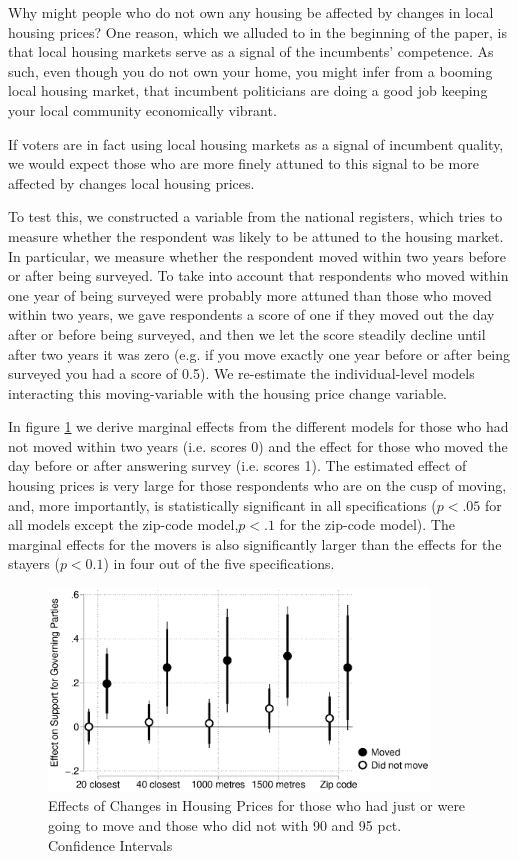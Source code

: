 \documentclass[12pt,a4paper]{article}
\begin{document}
	Why might people who do not own any housing be affected by changes in local housing prices? One reason, which we alluded to in the beginning of the paper, is that local housing markets serve as a signal of the incumbents' competence. As such, even though you do not own your home, you might infer from a booming local housing market, that incumbent politicians are doing a good job keeping your local community economically vibrant.
	
	If voters are in fact using local housing markets as a signal of incumbent quality, we would expect those who are more finely attuned to this signal to be more affected by changes local housing prices.
	
	To test this, we constructed a variable from the national registers, which tries to measure whether the respondent was likely to be attuned to the housing market. In particular, we measure whether the respondent moved within two years before or after being surveyed. To take into account that respondents who moved within one year of being surveyed were probably more attuned than those who moved within two years, we gave respondents a score of one if they moved out the day after or before being surveyed, and then we let the score steadily decline until after two years it was zero (e.g. if you move exactly one year before or after being surveyed you had a score of 0.5). We re-estimate the individual-level models interacting this moving-variable with the housing price change variable.
	
	In figure \ref{move} we derive marginal effects from the different models for those who had not moved within two years (i.e. scores 0) and the effect for those who moved the day before or after answering survey (i.e. scores 1). The estimated effect of housing prices is very large for those respondents who are on the cusp of moving, and, more importantly, is statistically significant in all specifications ($p<.05$ for all models except the zip-code model,$p<.1$ for the zip-code model). The marginal effects for the movers is also significantly larger than the effects for the stayers ($p<0.1$) in four out of the five specifications.
	
	\begin{figure}[htbp!]
		\includegraphics[width=0.9\textwidth]{../figures/moving.eps}
		\centering
		\caption{Effects of Changes in Housing Prices for those who had just or were going to move and those who did not with 90 and 95 pct. Confidence Intervals}\label{move}
	\end{figure}
	
\end{document}
